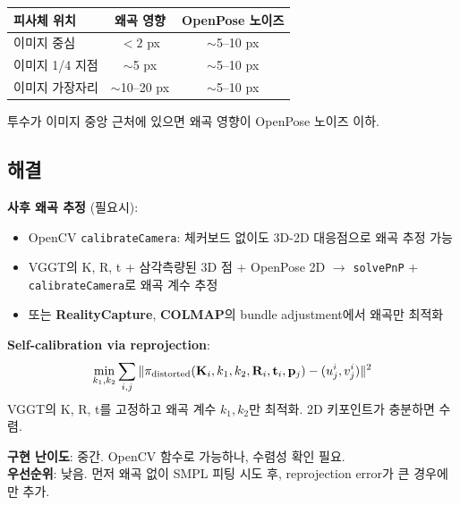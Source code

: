 \documentclass[11pt, a4paper]{report}
\begin{document}
\begin{table}[H]
\centering
\renewcommand{\arraystretch}{1.3}
\begin{tabular}{l c c}
\toprule
\textbf{피사체 위치} & \textbf{왜곡 영향} & \textbf{OpenPose 노이즈} \\
\midrule
이미지 중심 & $< 2$ px & $\sim$5--10 px \\
이미지 1/4 지점 & $\sim$5 px & $\sim$5--10 px \\
이미지 가장자리 & $\sim$10--20 px & $\sim$5--10 px \\
\bottomrule
\end{tabular}
\end{table}

투수가 이미지 중앙 근처에 있으면 왜곡 영향이 OpenPose 노이즈 이하.

\subsection{해결}

\begin{ossbox}
\textbf{사후 왜곡 추정} (필요시):
\begin{itemize}[leftmargin=*]
  \item OpenCV \texttt{calibrateCamera}: 체커보드 없이도 3D-2D 대응점으로 왜곡 추정 가능
  \item VGGT의 K, R, t + 삼각측량된 3D 점 + OpenPose 2D $\rightarrow$ \texttt{solvePnP} + \texttt{calibrateCamera}로 왜곡 계수 추정
  \item 또는 \textbf{RealityCapture}, \textbf{COLMAP}의 bundle adjustment에서 왜곡만 최적화
\end{itemize}
\end{ossbox}

\begin{mathbox}
\textbf{Self-calibration via reprojection}:
\begin{equation}
\min_{k_1, k_2} \sum_{i,j} \| \pi_\text{distorted}(\mathbf{K}_i, k_1, k_2, \mathbf{R}_i, \mathbf{t}_i, \mathbf{p}_j) - (u_j^i, v_j^i) \|^2
\end{equation}
VGGT의 K, R, t를 고정하고 왜곡 계수 $k_1, k_2$만 최적화. 2D 키포인트가 충분하면 수렴.
\end{mathbox}

\begin{devbox}
\textbf{구현 난이도}: 중간. OpenCV 함수로 가능하나, 수렴성 확인 필요.\\
\textbf{우선순위}: 낮음. 먼저 왜곡 없이 SMPL 피팅 시도 후, reprojection error가 큰 경우에만 추가.
\end{devbox}
\end{document}
